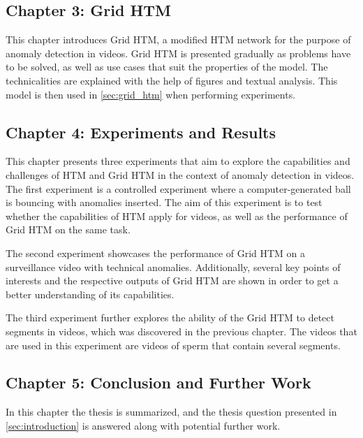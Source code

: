 \subsection*{Chapter 3: Grid HTM}
This chapter introduces Grid HTM, a modified HTM network for the purpose of anomaly detection in videos. Grid HTM is presented gradually as problems have to be solved, as well as use cases that suit the properties of the model. The technicalities are explained with the help of figures and textual analysis. This model is then used in \autoref{sec:grid_htm} when performing experiments.
\subsection*{Chapter 4: Experiments and Results}
This chapter presents three experiments that aim to explore the capabilities and challenges of HTM and Grid HTM in the context of anomaly detection in videos. The first experiment is a controlled experiment where a computer-generated ball is bouncing with anomalies inserted. The aim of this experiment is to test whether the capabilities of HTM apply for videos, as well as the performance of Grid HTM on the same task.
\par
The second experiment showcases the performance of Grid HTM on a surveillance video with technical anomalies. Additionally, several key points of interests and the respective outputs of Grid HTM are shown in order to get a better understanding of its capabilities.
\par
The third experiment further explores the ability of the Grid HTM to detect segments in videos, which was discovered in the previous chapter. The videos that are used in this experiment are videos of sperm that contain several segments.
\subsection*{Chapter 5: Conclusion and Further Work}
In this chapter the thesis is summarized, and the thesis question presented in \autoref{sec:introduction} is answered along with potential further work.